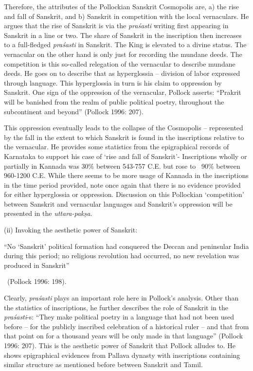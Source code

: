 Therefore, the attributes of the Pollockian Sanskrit Cosmopolis are, a) the rise and fall of Sanskrit, and b) Sanskrit in competition with the local vernaculars. He argues that the rise of Sanskrit is via the \textit{praśasti} writing first appearing in Sanskrit in a line or two. The share of Sanskrit in the inscription then increases to a full-fledged \textit{praśasti} in Sanskrit. The King is elevated to a divine status. The vernacular on the other hand is only just for recording the mundane deeds. The competition is this so-called relegation of the vernacular to describe mundane deeds. He goes on to describe that as hyperglossia – division of labor expressed through language. This hyperglossia in turn is his claim to oppression by Sanskrit. One sign of the oppression of the vernacular, Pollock asserts: “Prakrit will be banished from the realm of public political poetry, throughout the subcontinent and beyond” (Pollock 1996: 207).

This oppression eventually leads to the collapse of the Cosmopolis – represented by the fall in the extent to which Sanskrit is found in the inscriptions relative to the vernacular. He provides some statistics from the epigraphical records of Karnataka to support his case of ‘rise and fall of Sanskrit’- Inscriptions wholly or partially in Kannada was 30\% between 543-757 C.E. but rose to ~90\% between 960-1200 C.E. While there seems to be more usage of Kannada in the inscriptions in the time period provided, note once again that there is no evidence provided for either hyperglossia or oppression. Discussion on this Pollockian ‘competition’ between Sanskrit and vernacular languages and Sanskrit’s oppression will be presented in the \textit{uttara-pakṣa}.

(ii) Invoking the aesthetic power of Sanskrit:

\begin{myquote}
“No ‘Sanskrit’ political formation had conquered the Deccan and peninsular India during this period; no religious revolution had occurred, no new revelation was produced in Sanskrit” 

~\hfill (Pollock 1996: 198).
\end{myquote}

Clearly, \textit{praśasti} plays an important role here in Pollock’s analysis. Other than the statistics of inscriptions, he further describes the role of Sanskrit in the \textit{praśasti}-s: “They make political poetry in a language that had not been used before – for the publicly inscribed celebration of a historical ruler – and that from that point on for a thousand years will be only made in that language” (Pollock 1996: 207). This is the aesthetic power of Sanskrit that Pollock alludes to. He shows epigraphical evidences from Pallava dynasty with inscriptions containing similar structure as mentioned before between Sanskrit and Tamil.

